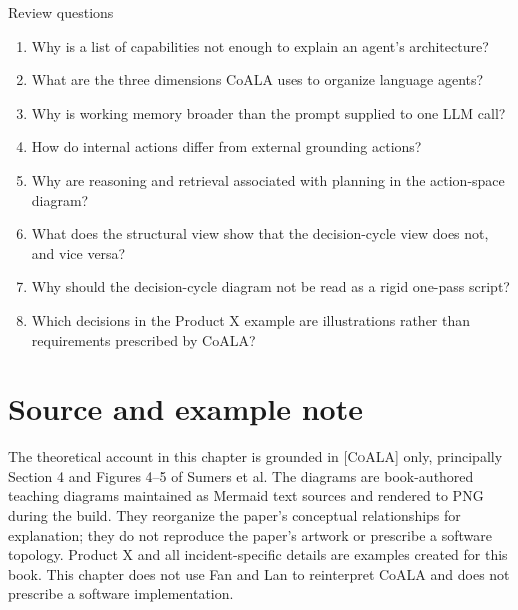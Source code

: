 \begin{reviewquestions}{Review questions}
\begin{enumerate}
  \item Why is a list of capabilities not enough to explain an agent's architecture?
  \item What are the three dimensions CoALA uses to organize language agents?
  \item Why is working memory broader than the prompt supplied to one LLM call?
  \item How do internal actions differ from external grounding actions?
  \item Why are reasoning and retrieval associated with planning in the action-space diagram?
  \item What does the structural view show that the decision-cycle view does not, and vice versa?
  \item Why should the decision-cycle diagram not be read as a rigid one-pass script?
  \item Which decisions in the Product X example are illustrations rather than requirements prescribed by CoALA?
\end{enumerate}
\end{reviewquestions}

\section*{Source and example note}
The theoretical account in this chapter is grounded in \textsc{[CoALA]} only, principally Section 4 and Figures 4--5 of Sumers et al. The diagrams are book-authored teaching diagrams maintained as Mermaid text sources and rendered to PNG during the build. They reorganize the paper's conceptual relationships for explanation; they do not reproduce the paper's artwork or prescribe a software topology. Product X and all incident-specific details are examples created for this book. This chapter does not use Fan and Lan to reinterpret CoALA and does not prescribe a software implementation.
